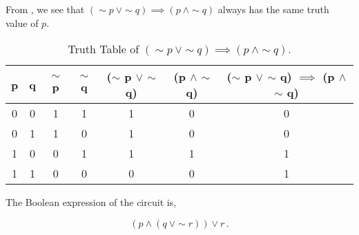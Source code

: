 %
%

\begin{subquestions}


\subquestion

From , we see that $(\sim p ~\lor \sim q) \implies (p ~\land \sim q)$ always has the same truth value of $p$.

\begin{table}[ht]
	\centering
	\begin{tabular}{|c|c|c|c|c|c|c|}
		\hline
		p & q & $\sim$ p & $\sim$ q & ($\sim$ p $\lor$ $\sim$ q) & (p $\land$ $\sim$ q) & ($\sim$ p $\lor$ $\sim$ q) $\implies$ (p $\land$ $\sim$ q) \\
		\hline
		0 & 0 & 1 & 1 & 1 & 0 & 0 \\
		0 & 1 & 1 & 0 & 1 & 0 & 0 \\
		1 & 0 & 0 & 1 & 1 & 1 & 1 \\
		1 & 1 & 0 & 0 & 0 & 0 & 1 \\
		\hline
	\end{tabular}
	\caption{\label{2011:q2:tab:TruthTab1} Truth Table of $(\sim p ~\lor \sim q) \implies (p ~\land \sim q)$.}
\end{table}


\subquestion

The Boolean expression of the circuit is,

\begin{equation}
	(p \land (q ~\lor \sim r)) \lor r\,.
\end{equation}



\end{subquestions}
